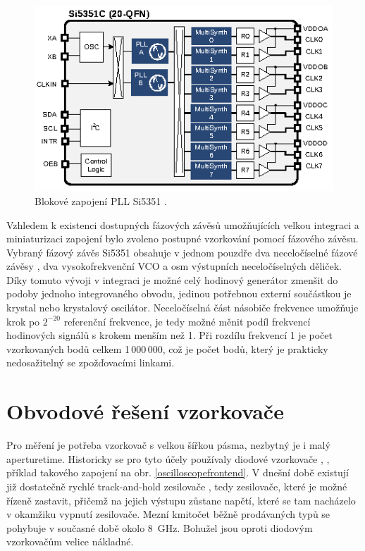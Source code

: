 \begin{figure}[htbp]\includegraphics[width=\textwidth,keepaspectratio]{images/si5351_internal_architecture_overview.eps}\caption{Blokové zapojení \acrshort{PLL} Si5351 \cite{Si5351datasheet}.}\label{5351blockdiagram}\end{figure}

Vzhledem k existenci dostupných fázových závěsů umožňujících velkou integraci a miniaturizaci zapojení bylo zvoleno postupné vzorkování pomocí fázového závěsu. Vybraný fázový závěs Si5351 obsahuje v jednom pouzdře dva neceločíselné fázové závěsy \cite{Si5351datasheet}, dva vysokofrekvenční \acrshort{VCO} a osm výstupních neceločíselných děliček. Díky tomuto vývoji v integraci je možné celý hodinový generátor zmenšit do podoby jednoho integrovaného obvodu, jedinou potřebnou externí součástkou je krystal nebo krystalový oscilátor. Neceločíselná část násobiče frekvence umožňuje krok po $2^{{-20}}$ referenční frekvence, je tedy možné měnit podíl frekvencí hodinových signálů s krokem menším než \SI{1}{\ppm}. Při rozdílu frekvencí \SI{1}{\ppm} je počet vzorkovaných bodů celkem 1\,000\,000, což je počet bodů, který je prakticky nedosažitelný se zpožďovacími linkami.

\section{Obvodové řešení vzorkovače}
Pro měření je potřeba vzorkovač s velkou šířkou pásma, nezbytný je i malý \gls{aperturetime}. Historicky se pro tyto účely používaly diodové vzorkovače \cite{S-1manual}, \cite{S-4manual}, příklad takového zapojení na obr. \ref{oscilloscopefrontend}. V dnešní době existují již dostatečně rychlé track-and-hold zesilovače \cite{highspeed_trackhold}, tedy zesilovače, které je možné řízeně zastavit, přičemž na jejich výstupu zůstane napětí, které se tam nacházelo v okamžiku vypnutí zesilovače. Mezní kmitočet běžně prodávaných typů se pohybuje v současné době okolo \SI{8}{\giga\hertz}. Bohužel jsou oproti diodovým vzorkovačům velice nákladné.

